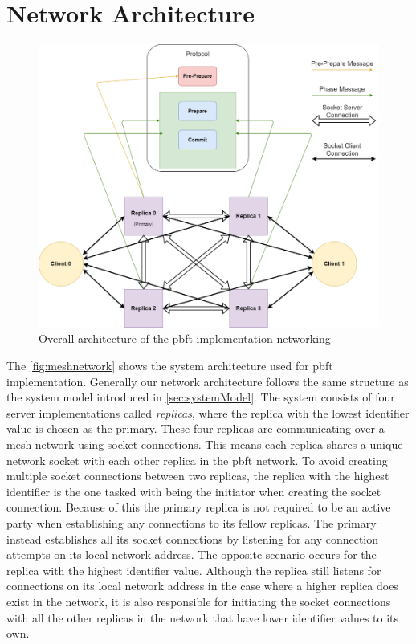 \section{Network Architecture}
\begin{figure}
	\centering
	\includegraphics[width=\linewidth]{figures/meshnetwork}
	\caption{Overall architecture of the \ac{pbft} implementation networking}
	\label{fig:meshnetwork}
\end{figure}
The \autoref{fig:meshnetwork} shows the system architecture used for \ac{pbft} implementation. Generally our network architecture follows the same structure as the system model introduced in \autoref{sec:systemModel}. The system consists of four server implementations called \emph{replicas}, where the replica with the lowest identifier value is chosen as the primary. These four replicas are communicating over a mesh network using socket connections. This means each replica shares a unique network socket with each other replica in the \ac{pbft} network. To avoid creating multiple socket connections between two replicas, the replica with the highest identifier is the one tasked with being the initiator when creating the socket connection. Because of this the primary replica is not required to be an active party when establishing any connections to its fellow replicas. The primary instead establishes all its socket connections by listening for any connection attempts on its local network address. The opposite scenario occurs for the replica with the highest identifier value. Although the replica still listens for connections on its local network address in the case where a higher replica does exist in the network, it is also responsible for initiating the socket connections with all the other replicas in the network that have lower identifier values to its own.

